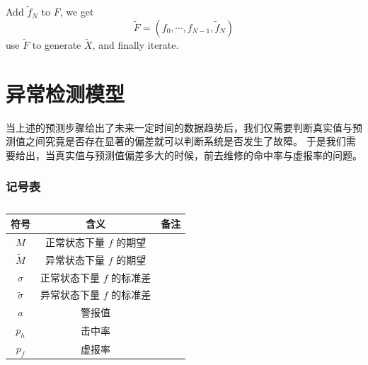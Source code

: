 \documentclass[a4paper]{article}
\begin{document}
Add $\tilde{f}_N$ to $F$, we get
\begin{equation}
	\label{eqn:ssa_new_f}
	\tilde{F} = (f_0, \cdots, f_{N-1}, \tilde{f}_N)
\end{equation}
use $\tilde{F}$ to generate $\tilde{X}$, and finally iterate.

\part{异常检测模型}
当上述的预测步骤给出了未来一定时间的数据趋势后，我们仅需要判断真实值与预测值之间究竟是否存在显著的偏差就可以判断系统是否发生了故障。
于是我们需要给出，当真实值与预测值偏差多大的时候，前去维修的命中率与虚报率的问题。
\section*{记号表}
\begin{table}[H]
	\centering
	\caption{}
	\label{tab:sdt_symbols}
	\begin{tabular}{ccc}
		\hline
		符号 & 含义 & 备注 \\
		\hline
		$M$ & 正常状态下量 $f$ 的期望 & \\
		$\tilde{M}$ & 异常状态下量 $f$ 的期望 & \\
		$\sigma$ & 正常状态下量 $f$ 的标准差 & \\
		$\tilde{\sigma}$ & 异常状态下量 $f$ 的标准差 & \\
		$a$ & 警报值 & \\
		$p_h$ & 击中率 & \\
		$p_f$ & 虚报率 & \\
		\hline
	\end{tabular} \\
\end{table}
\end{document}
